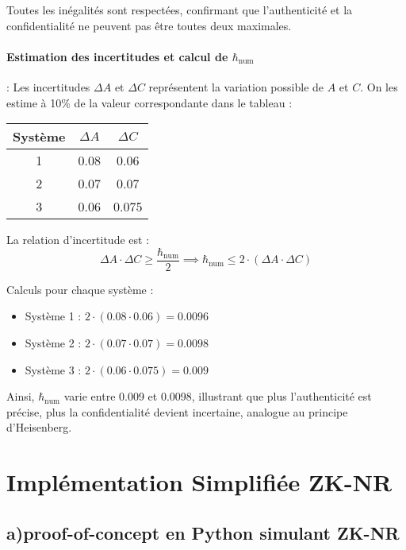 \documentclass[12pt,a4paper]{report}
\begin{document}
{		Toutes les inégalités sont respectées, confirmant que l'authenticité et la confidentialité ne peuvent pas être toutes deux maximales.
		
		\paragraph{ Estimation des incertitudes et calcul de $\hbar_\text{num}$}:
		Les incertitudes $\Delta A$ et $\Delta C$ représentent la variation possible de $A$ et $C$. On les estime à 10\% de la valeur correspondante dans le tableau :
		
		\begin{center}
			\begin{tabular}{|c|c|c|}
				\hline
				Système & $\Delta A$ & $\Delta C$ \\
				\hline
				1 & 0.08 & 0.06 \\
				2 & 0.07 & 0.07 \\
				3 & 0.06 & 0.075 \\
				\hline
			\end{tabular}
		\end{center}
		
		La relation d'incertitude est :
		\[
		\Delta A \cdot \Delta C \ge \frac{\hbar_\text{num}}{2} \implies \hbar_\text{num} \le 2 \cdot (\Delta A \cdot \Delta C)
		\]
		
		Calculs pour chaque système :
		\begin{itemize}
			\item Système 1 : $2 \cdot (0.08 \cdot 0.06) = 0.0096$
			\item Système 2 : $2 \cdot (0.07 \cdot 0.07) = 0.0098$
			\item Système 3 : $2 \cdot (0.06 \cdot 0.075) = 0.009$
		\end{itemize}
		
		Ainsi, $\hbar_\text{num}$ varie entre 0.009 et 0.0098, illustrant que plus l'authenticité est précise, plus la confidentialité devient incertaine, analogue au principe d'Heisenberg.
		
	    \section*{Implémentation Simplifiée ZK-NR}
		\subsection*{a)proof-of-concept en Python simulant ZK-NR}
}
\end{document}
